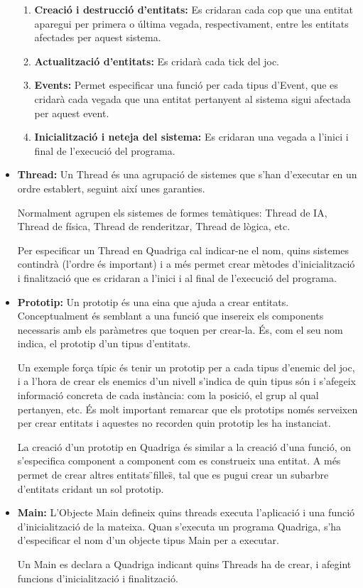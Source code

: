 \begin{itemize}
      \begin{enumerate}
        \item {\bf Creació i destrucció d'entitats:} Es cridaran cada cop que una entitat aparegui per primera o última vegada, respectivament, entre les entitats afectades per aquest sistema.
        \item {\bf Actualització d'entitats:} Es cridarà cada tick del joc.
        \item {\bf Events:} Permet especificar una funció per cada tipus d'Event, que es cridarà cada vegada que una entitat pertanyent al sistema sigui afectada per aquest event.
        \item {\bf Inicialització i neteja del sistema:} Es cridaran una vegada a l'inici i final de l'execució del programa.
      \end{enumerate}
      
    \item{\bf Thread:}
      Un Thread és una agrupació de sistemes que s'han d'executar en un ordre establert, seguint així unes garanties.
      
      Normalment agrupen els sistemes de formes temàtiques: Thread de IA, Thread de física, Thread de renderitzar, Thread de lògica, etc.
      
      Per especificar un Thread en Quadriga cal indicar-ne el nom, quins sistemes contindrà (l'ordre és important) i a més permet crear mètodes d'inicialització i finalització que es cridaran a l'inici i al final de l'execució del programa.

    \item{\bf Prototip:}
      Un prototip és una eina que ajuda a crear entitats. Conceptualment és semblant a una funció que insereix els components necessaris amb els paràmetres que toquen per crear-la. És, com el seu nom indica, el prototip d'un tipus d'entitats.
      
      Un exemple força típic és tenir un prototip per a cada tipus d'enemic del joc, i a l'hora de crear els enemics d'un nivell s'indica de quin tipus són i s'afegeix informació concreta de cada instància: com la posició, el grup al qual pertanyen, etc. És molt important remarcar que els prototips només serveixen per crear entitats i aquestes no recorden quin prototip les ha instanciat.
      
      La creació d'un prototip en Quadriga és similar a la creació d'una funció, on s'especifica component a component com es construeix una entitat. A més permet de crear altres entitats \"{}filles\"{}, tal que es pugui crear un subarbre d'entitats cridant un sol prototip.

    \item{\bf Main:}
      L'Objecte Main defineix quins threads executa l'aplicació i una funció d'inicialització de la mateixa. Quan s'executa un programa Quadriga, s'ha d'especificar el nom d'un objecte tipus Main per a executar.
    
      Un Main es declara a Quadriga indicant quins Threads ha de crear, i afegint funcions d'inicialització i finalització.
    
  \end{itemize}

